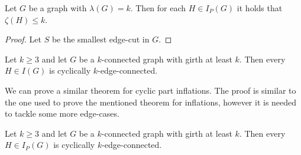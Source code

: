 \documentclass[12pt, twoside]{book}
\begin{document}
\begin{lemma}
	Let $G$ be a graph with $\lambda(G)=k$. Then for each $H\in I_P(G)$ it holds that $\zeta(H)\leq k$.
\end{lemma}

\begin{proof}
	Let $S$ be the smallest edge-cut in $G$. 
\end{proof}

\begin{theorem}
	Let $k \geq 3$ and let $G$ be a $k$-connected graph with girth at least $k$. Then every $H \in I(G)$ is cyclically $k$-edge-connected.
\end{theorem}

We can prove a similar theorem for cyclic part inflations. The proof is similar to the one used to prove the mentioned theorem for inflations, however it is needed to tackle some more edge-cases.

\begin{theorem}
	Let $k\geq 3$ and let $G$ be a $k$-connected graph with girth at least $k$. Then every  $H\in I_P(G)$ is cyclically $k$-edge-connected.
\end{theorem}
\end{document}
